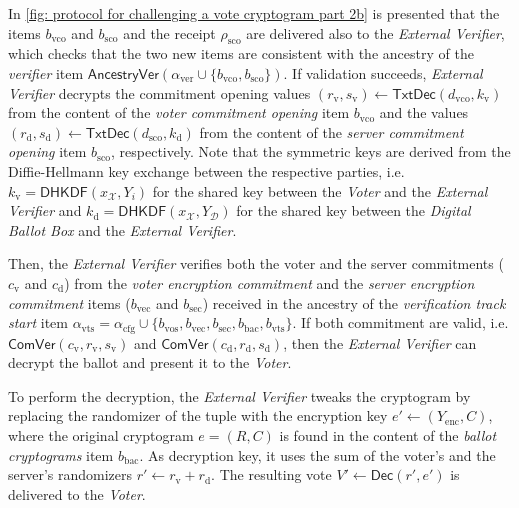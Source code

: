 In \cref{fig: protocol for challenging a vote cryptogram part 2b} is presented that the items $b_\mathrm{vco}$ and $b_\mathrm{sco}$ and the receipt $\rho_\mathrm{sco}$ are delivered also to the \textit{External Verifier}, which checks that the two new items are consistent with the ancestry of the \textit{verifier} item $\mathsf{AncestryVer}(\alpha_\mathrm{ver} \cup \{ b_\mathrm{vco}, b_\mathrm{sco} \})$. If validation succeeds, \textit{External Verifier} decrypts the commitment opening values $(r_\mathrm{v}, s_\mathrm{v}) \gets \mathsf{TxtDec}(d_\mathrm{vco}, k_\mathrm{v})$ from the content of the \textit{voter commitment opening} item $b_\mathrm{vco}$ and the values $(r_\mathrm{d}, s_\mathrm{d}) \gets \mathsf{TxtDec}(d_\mathrm{sco}, k_\mathrm{d})$ from the content of the \textit{server commitment opening} item $b_\mathrm{sco}$, respectively. Note that the symmetric keys are derived from the Diffie-Hellmann key exchange between the respective parties, i.e. $k_\mathrm{v} = \mathsf{DHKDF}(x_\mathcal{X}, Y_i)$ for the shared key between the \textit{Voter} and the \textit{External Verifier} and $k_\mathrm{d} = \mathsf{DHKDF}(x_\mathcal{X}, Y_\mathcal{D})$ for the shared key between the \textit{Digital Ballot Box} and the \textit{External Verifier}.

Then, the \textit{External Verifier} verifies both the voter and the server commitments ($c_\mathrm{v}$ and $c_\mathrm{d}$) from the \textit{voter encryption commitment} and the \textit{server encryption commitment} items ($b_\mathrm{vec}$ and $b_\mathrm{sec}$) received in the ancestry of the \textit{verification track start} item $\alpha_\mathrm{vts} = \alpha_\mathrm{cfg} \cup \{ b_\mathrm{vos}, b_\mathrm{vec}, b_\mathrm{sec}, b_\mathrm{bac}, b_\mathrm{vts} \}$. If both commitment are valid, i.e. $\mathsf{ComVer}(c_\mathrm{v}, r_\mathrm{v}, s_\mathrm{v})$ and $\mathsf{ComVer}(c_\mathrm{d}, r_\mathrm{d}, s_\mathrm{d})$, then the \textit{External Verifier} can decrypt the ballot and present it to the \textit{Voter}.

To perform the decryption, the \textit{External Verifier} tweaks the cryptogram by replacing the randomizer of the tuple with the encryption key $e' \gets (Y_\mathrm{enc}, C)$, where the original cryptogram $e = (R, C)$ is found in the content of the \textit{ballot cryptograms} item $b_\mathrm{bac}$. As decryption key, it uses the sum of the voter's and the server's randomizers $r' \gets r_\mathrm{v} + r_\mathrm{d}$. The resulting vote $V' \gets \mathsf{Dec}(r', e')$ is delivered to the \textit{Voter}.

